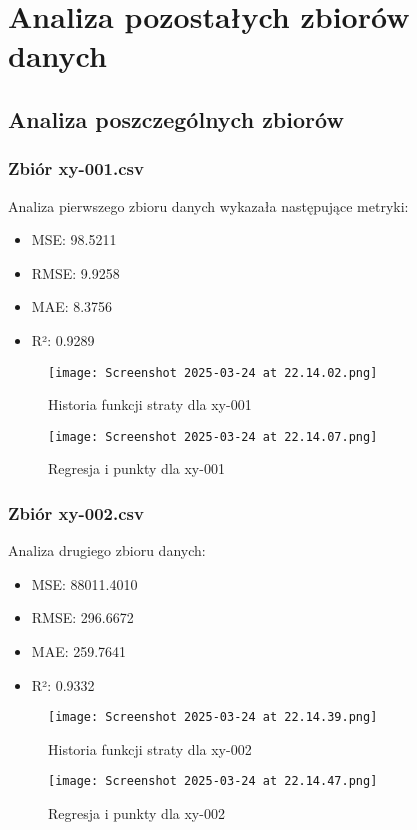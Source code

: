 \documentclass{article}
\begin{document}
\section{Analiza pozostałych zbiorów danych}

\subsection{Analiza poszczególnych zbiorów}

\subsubsection{Zbiór xy-001.csv}
Analiza pierwszego zbioru danych wykazała następujące metryki:
\begin{itemize}
    \item MSE: 98.5211
    \item RMSE: 9.9258
    \item MAE: 8.3756
    \item R²: 0.9289
\end{itemize}

\begin{figure}[H]
    \centering
    \begin{minipage}{0.45\textwidth}
        \texttt{[image: Screenshot 2025-03-24 at 22.14.02.png]}
        \caption{Historia funkcji straty dla xy-001}
    \end{minipage}
    \hfill
    \begin{minipage}{0.45\textwidth}
        \texttt{[image: Screenshot 2025-03-24 at 22.14.07.png]}
        \caption{Regresja i punkty dla xy-001}
    \end{minipage}
\end{figure}

\subsubsection{Zbiór xy-002.csv}
Analiza drugiego zbioru danych:
\begin{itemize}
    \item MSE: 88011.4010
    \item RMSE: 296.6672
    \item MAE: 259.7641
    \item R²: 0.9332
\end{itemize}

\begin{figure}[H]
    \centering
    \begin{minipage}{0.45\textwidth}
        \texttt{[image: Screenshot 2025-03-24 at 22.14.39.png]}
        \caption{Historia funkcji straty dla xy-002}
    \end{minipage}
    \hfill
    \begin{minipage}{0.45\textwidth}
        \texttt{[image: Screenshot 2025-03-24 at 22.14.47.png]}
        \caption{Regresja i punkty dla xy-002}
    \end{minipage}
\end{figure}
\end{document}
